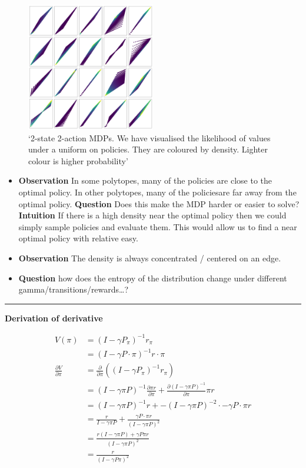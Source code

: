 \begin{figure}
\centering
\includegraphics[width=0.5\textwidth,height=0.5\textheight]{../../pictures/figures/polytope_densities.png}
\caption{`2-state 2-action MDPs. We have visualised the likelihood of
values under a uniform on policies. They are coloured by density.
Lighter colour is higher probability'}
\end{figure}

\begin{itemize}
\item
  \textbf{Observation} In some polytopes, many of the policies are close
  to the optimal policy. In other polytopes, many of the policiesare far
  away from the optimal policy. \textbf{Question} Does this make the MDP
  harder or easier to solve? \textbf{Intuition} If there is a high
  density near the optimal policy then we could simply sample policies
  and evaluate them. This would allow us to find a near optimal policy
  with relative easy.
\item
  \textbf{Observation} The density is always concentrated / centered on
  an edge.
\item
  \textbf{Question} how does the entropy of the distribution change
  under different gamma/transitions/rewards\ldots{}?
\end{itemize}

\begin{center}\rule{0.5\linewidth}{\linethickness}\end{center}

\textbf{Derivation of derivative}

\begin{align}
V(\pi) &= (I − \gamma P_{\pi})^{−1}r_{\pi} \\
&= (I − \gamma P\cdot \pi)^{−1}r\cdot \pi \\
\frac{\partial V}{\partial \pi} &= \frac{\partial}{\partial \pi}((I-\gamma P_{\pi})^{-1} r_{\pi}) \\
&= (I-\gamma \pi P)^{-1} \frac{\partial \pi r}{\partial \pi}+   \frac{\partial (I-\gamma \pi P)^{-1}}{\partial \pi}\pi r\tag{product rule} \\
&= (I-\gamma \pi P)^{-1} r + -(I-\gamma \pi P)^{-2} \cdot -\gamma P\cdot \pi r\\
&= \frac{r}{I-\gamma \pi P} + \frac{ \gamma P\cdot \pi r}{(I-\gamma \pi P)^2}\\
&= \frac{r(I-\gamma \pi P) + \gamma P \pi r}{(I-\gamma \pi P)^2} \\
& = \frac{r}{(I-\gamma P \pi)^2} \\
\end{align}


